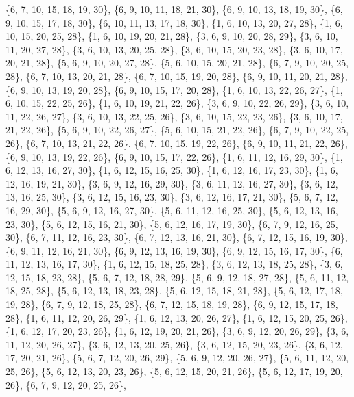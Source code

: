 \documentclass[11pt,a4paper]{article}
\begin{document}
{\{6, 7, 10, 15, 18, 19, 30\}, \{6, 9, 10, 11, 18, 21, 30\}, \{6, 9, 10, 13, 18, 19, 30\}, \{6, 9, 10, 15, 17, 18, 30\}, \{6, 10, 11, 13, 17, 18, 30\},
\{1, 6, 10, 13, 20, 27, 28\}, \{1, 6, 10, 15, 20, 25, 28\}, \{1, 6, 10, 19, 20, 21, 28\}, \{3, 6, 9, 10, 20, 28, 29\}, \{3, 6, 10, 11, 20, 27, 28\},
\{3, 6, 10, 13, 20, 25, 28\}, \{3, 6, 10, 15, 20, 23, 28\}, \{3, 6, 10, 17, 20, 21, 28\}, \{5, 6, 9, 10, 20, 27, 28\}, \{5, 6, 10, 15, 20, 21, 28\},
\{6, 7, 9, 10, 20, 25, 28\}, \{6, 7, 10, 13, 20, 21, 28\}, \{6, 7, 10, 15, 19, 20, 28\}, \{6, 9, 10, 11, 20, 21, 28\}, \{6, 9, 10, 13, 19, 20, 28\},
\{6, 9, 10, 15, 17, 20, 28\}, \{1, 6, 10, 13, 22, 26, 27\}, \{1, 6, 10, 15, 22, 25, 26\}, \{1, 6, 10, 19, 21, 22, 26\}, \{3, 6, 9, 10, 22, 26, 29\},
\{3, 6, 10, 11, 22, 26, 27\}, \{3, 6, 10, 13, 22, 25, 26\}, \{3, 6, 10, 15, 22, 23, 26\}, \{3, 6, 10, 17, 21, 22, 26\}, \{5, 6, 9, 10, 22, 26, 27\},
\{5, 6, 10, 15, 21, 22, 26\}, \{6, 7, 9, 10, 22, 25, 26\}, \{6, 7, 10, 13, 21, 22, 26\}, \{6, 7, 10, 15, 19, 22, 26\}, \{6, 9, 10, 11, 21, 22, 26\},
\{6, 9, 10, 13, 19, 22, 26\}, \{6, 9, 10, 15, 17, 22, 26\}, \{1, 6, 11, 12, 16, 29, 30\}, \{1, 6, 12, 13, 16, 27, 30\}, \{1, 6, 12, 15, 16, 25, 30\},
\{1, 6, 12, 16, 17, 23, 30\}, \{1, 6, 12, 16, 19, 21, 30\}, \{3, 6, 9, 12, 16, 29, 30\}, \{3, 6, 11, 12, 16, 27, 30\}, \{3, 6, 12, 13, 16, 25, 30\},
\{3, 6, 12, 15, 16, 23, 30\}, \{3, 6, 12, 16, 17, 21, 30\}, \{5, 6, 7, 12, 16, 29, 30\}, \{5, 6, 9, 12, 16, 27, 30\}, \{5, 6, 11, 12, 16, 25, 30\},
\{5, 6, 12, 13, 16, 23, 30\}, \{5, 6, 12, 15, 16, 21, 30\}, \{5, 6, 12, 16, 17, 19, 30\}, \{6, 7, 9, 12, 16, 25, 30\}, \{6, 7, 11, 12, 16, 23, 30\},
\{6, 7, 12, 13, 16, 21, 30\}, \{6, 7, 12, 15, 16, 19, 30\}, \{6, 9, 11, 12, 16, 21, 30\}, \{6, 9, 12, 13, 16, 19, 30\}, \{6, 9, 12, 15, 16, 17, 30\},
\{6, 11, 12, 13, 16, 17, 30\}, \{1, 6, 12, 15, 18, 25, 28\}, \{3, 6, 12, 13, 18, 25, 28\}, \{3, 6, 12, 15, 18, 23, 28\}, \{5, 6, 7, 12, 18, 28, 29\},
\{5, 6, 9, 12, 18, 27, 28\}, \{5, 6, 11, 12, 18, 25, 28\}, \{5, 6, 12, 13, 18, 23, 28\}, \{5, 6, 12, 15, 18, 21, 28\}, \{5, 6, 12, 17, 18, 19, 28\},
\{6, 7, 9, 12, 18, 25, 28\}, \{6, 7, 12, 15, 18, 19, 28\}, \{6, 9, 12, 15, 17, 18, 28\}, \{1, 6, 11, 12, 20, 26, 29\}, \{1, 6, 12, 13, 20, 26, 27\},
\{1, 6, 12, 15, 20, 25, 26\}, \{1, 6, 12, 17, 20, 23, 26\}, \{1, 6, 12, 19, 20, 21, 26\}, \{3, 6, 9, 12, 20, 26, 29\}, \{3, 6, 11, 12, 20, 26, 27\},
\{3, 6, 12, 13, 20, 25, 26\}, \{3, 6, 12, 15, 20, 23, 26\}, \{3, 6, 12, 17, 20, 21, 26\}, \{5, 6, 7, 12, 20, 26, 29\}, \{5, 6, 9, 12, 20, 26, 27\},
\{5, 6, 11, 12, 20, 25, 26\}, \{5, 6, 12, 13, 20, 23, 26\}, \{5, 6, 12, 15, 20, 21, 26\}, \{5, 6, 12, 17, 19, 20, 26\}, \{6, 7, 9, 12, 20, 25, 26\},
}
\end{document}
